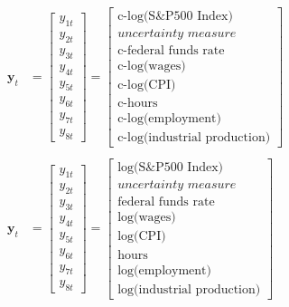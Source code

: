 \documentclass[a4paper,11pt,listof=nochaptergap,oneside,pointednumbers,bibtotoc,bigheadings,liststotoc,hidelinks]{scrbook}
\theoremstyle{mysatz}
\theoremstyle{mydefinition}
\theoremstyle{mytheorem}
\theoremstyle{mybemerkung}
\newcommand{\vect}[1]{\boldsymbol{\mathbf{#1}}}
\begin{document}
\begin{equation} \label{eq:VAR8}
\begin{split}
\vect{y}_t &  = 
 \begin{bmatrix} 
 		y_{1t} \\
		y_{2t} \\
		y_{3t} \\
		y_{4t} \\
		y_{5t} \\
		y_{6t} \\
		y_{7t} \\
		y_{8t} 
	      \end{bmatrix} = 
 \begin{bmatrix} \text{c-log(S\&P500 Index)} \\ 
				      \textit{uncertainty measure}\\ 
				      \text{c-federal funds rate}\\
				      \text{c-log(wages)}\\
				      \text{c-log(CPI)}\\
				      \text{c-hours}\\
				      \text{c-log(employment)}\\
				      \text{c-log(industrial production)}
	      \end{bmatrix}\\\\
\vect{y}_t & = 
 \begin{bmatrix} 
 		y_{1t} \\
		y_{2t} \\
		y_{3t} \\
		y_{4t} \\
		y_{5t} \\
		y_{6t} \\
		y_{7t} \\
		y_{8t} 
	      \end{bmatrix} = 	      
	      \begin{bmatrix} \text{log(S\&P500 Index)} \\ 
				      \textit{uncertainty measure}\\ 
				      \text{federal funds rate}\\
				      \text{log(wages)}\\
				      \text{log(CPI)}\\
				      \text{hours}\\
				      \text{log(employment)}\\
				      \text{log(industrial production)}
	      \end{bmatrix}
\end{split}
\end{equation}
\end{document}
